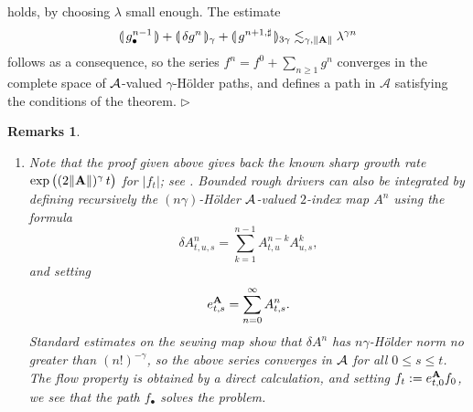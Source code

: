 \documentclass[11pt,a4paper]{amsart}
\renewcommand{\leq}{\leqslant}
\newcommand{\ssk}{\smallskip}
\newtheorem{rems}[thm]{{\sc Remarks}}
\numberwithin{equation}{section} %
\newenvironment{Dem}{%
    \begin{list}{\hspace{0.5cm}{\sc Proof --}}{%
        \setlength{\topsep}{0pt}%
        \setlength{\leftmargin}{0pt}%
        \setlength{\rightmargin}{0pt}%
        \setlength{\listparindent}{0pt}%
        \setlength{\itemindent}{0pt}%
        \setlength{\parsep}{0pt}%
        \addtolength{\leftmargin}{20pt}%
        \addtolength{\rightmargin}{0pt}%
    } \item }{\hfill{\space $\rhd$}\end{list}\smallskip}
\begin{document}
\begin{Dem}
$$$$  
holds, by choosing $\lambda$ small enough. The estimate
$$
\llparenthesis\, g^{n - 1}_\bullet\,\rrparenthesis + \llparenthesis\, \delta g^n \,\rrparenthesis_\gamma + \llparenthesis\, g^{n + 1, \sharp} \,\rrparenthesis_{3 \gamma} \lesssim_{\gamma, \| {\bf A} \|} \lambda^{\gamma n}
$$
follows as a consequence, so the series $f^n = f^0 + \sum_{n \geqslant 1} g^n$ converges in the complete space of $\mathcal{A}$-valued $\gamma$-H\"older paths, and defines a path in $\mathcal{A}$ satisfying the conditions of the theorem.
\end{Dem}

\ssk

\begin{rems}
\begin{enumerate}
   \item Note that the proof given above gives back the known sharp growth rate $\exp\big((2\| {\bf A}\|)^\gamma\,t\big)$ for $\big|f_t\big|$; see \cite{FrizOberhauser}. Bounded rough drivers can also be integrated by defining recursively the $(n\gamma)$-H\"older $\mathcal{A}$-valued $2$-index map $A^n$ using the formula
$$
\delta A^n_{t, u, s} = \sum_{k = 1}^{n - 1} A^{n - k}_{t, u} A^k_{u, s},
$$
and setting 
$$
e^{\bf A}_{t, s} = \sum_{n = 0}^{\infty} A^n_{t, s}.
$$ 
Standard estimates on the sewing map \cite{Gubinelli04} show that $\delta A^n$ has $n \gamma$-H\"older norm  no greater than $(n!)^{- \gamma}$, so the above series converges in $\mathcal{A}$ for all $0 \leq s \leq t$. The flow property is obtained by a direct calculation, and setting $f_t := e^{\bf A}_{t, 0} f_0$, we see that the path $f_\bullet$ solves the problem.   \vspace{0.2cm}


\end{enumerate}
\end{rems}
\end{document}
